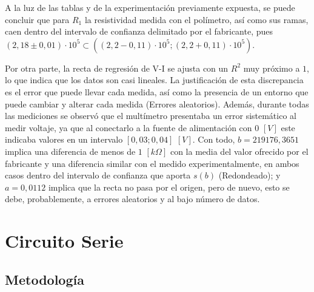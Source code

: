 \documentclass[11pt]{report}
\begin{document}
\begin{refsection}
A la luz de las tablas y de la experimentación previamente expuesta, se puede concluir que para $R_1$ la resistividad medida
con el polímetro, así como sus ramas, caen dentro del intervalo de confianza delimitado por el fabricante, pues 
$(2,18 \pm 0,01) \cdot 10^5 \subset ((2,2 - 0,11)\cdot 10^5;(2,2 + 0,11)\cdot 10^5)$. 

\medskip

Por otra parte, la recta de regresión de V-I 
se ajusta con un $R^2$ muy próximo a $1$, lo que indica que los datos son casi lineales. La justificación de esta discrepancia es el 
error que puede llevar cada medida, así como la presencia de un entorno que puede cambiar y alterar cada medida (Errores aleatorios).
Además, durante todas las mediciones se observó que el multímetro presentaba un error sistemático al medir voltaje, ya que al conectarlo a la
fuente de alimentación con $0\hspace{4pt}[V]$ este indicaba valores en un intervalo $[0,03;0,04] \hspace{4pt}[V]$. Con todo, $b=219176,3651$ 
implica una diferencia de menos de $1 \hspace{4pt} [k\Omega]$ con la media del valor ofrecido por el fabricante y una diferencia 
similar con el medido experimentalmente, en ambos casos dentro del intervalo de confianza que aporta $s(b)$ (Redondeado); 
y $a=0,0112$ implica que la recta no pasa por el origen, pero de nuevo, esto se debe, probablemente, a errores aleatorios y al 
bajo número de datos.

\section{\textbf{Circuito Serie}}
\subsection{Metodología}


\end{refsection}
\end{document}
